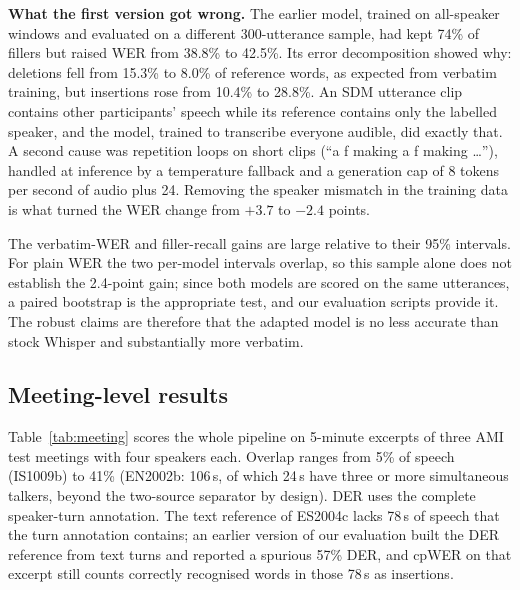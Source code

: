 \documentclass[conference]{IEEEtran}
\begin{document}
\textbf{What the first version got wrong.} The earlier model, trained on all-speaker windows and evaluated on a different 300-utterance sample, had kept 74\% of fillers but raised WER from 38.8\% to 42.5\%. Its error decomposition showed why: deletions fell from 15.3\% to 8.0\% of reference words, as expected from verbatim training, but insertions rose from 10.4\% to 28.8\%. An SDM utterance clip contains other participants' speech while its reference contains only the labelled speaker, and the model, trained to transcribe everyone audible, did exactly that. A second cause was repetition loops on short clips (``a f making a f making \ldots''), handled at inference by a temperature fallback and a generation cap of 8 tokens per second of audio plus 24. Removing the speaker mismatch in the training data is what turned the WER change from $+3.7$ to $-2.4$ points.

The verbatim-WER and filler-recall gains are large relative to their 95\% intervals. For plain WER the two per-model intervals overlap, so this sample alone does not establish the 2.4-point gain; since both models are scored on the same utterances, a paired bootstrap is the appropriate test, and our evaluation scripts provide it. The robust claims are therefore that the adapted model is no less accurate than stock Whisper and substantially more verbatim.

\subsection{Meeting-level results}
Table~\ref{tab:meeting} scores the whole pipeline on 5-minute excerpts of three AMI test meetings with four speakers each. Overlap ranges from 5\% of speech (IS1009b) to 41\% (EN2002b: 106\,s, of which 24\,s have three or more simultaneous talkers, beyond the two-source separator by design). DER uses the complete speaker-turn annotation. The text reference of ES2004c lacks 78\,s of speech that the turn annotation contains; an earlier version of our evaluation built the DER reference from text turns and reported a spurious 57\% DER, and cpWER on that excerpt still counts correctly recognised words in those 78\,s as insertions.
\end{document}
